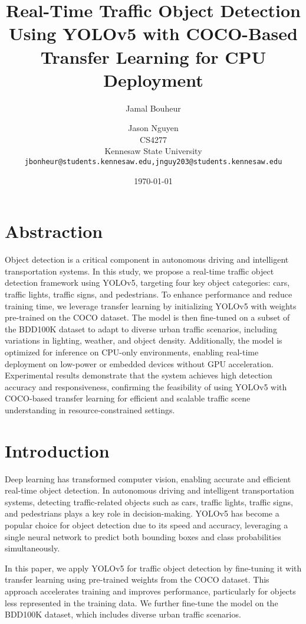 \documentclass[11pt]{article}
\title{Real-Time Traffic Object Detection Using YOLOv5 with COCO-Based Transfer Learning for CPU Deployment}
\author{Jamal Bouheur \and Jason Nguyen \\
        CS4277 \\
        Kennesaw State University \\
        \texttt{jbonheur@students.kennesaw.edu,jnguy203@students.kennesaw.edu}}
\date{\today}
\begin{document}
\maketitle

\section{Abstraction}
Object detection is a critical component in autonomous driving and intelligent transportation systems. In this study, we propose a real-time traffic object detection framework using YOLOv5, targeting four key object categories: cars, traffic lights, traffic signs, and pedestrians. To enhance performance and reduce training time, we leverage transfer learning by initializing YOLOv5 with weights pre-trained on the COCO dataset. The model is then fine-tuned on a subset of the BDD100K dataset to adapt to diverse urban traffic scenarios, including variations in lighting, weather, and object density. Additionally, the model is optimized for inference on CPU-only environments, enabling real-time deployment on low-power or embedded devices without GPU acceleration. Experimental results demonstrate that the system achieves high detection accuracy and responsiveness, confirming the feasibility of using YOLOv5 with COCO-based transfer learning for efficient and scalable traffic scene understanding in resource-constrained settings.


\section{Introduction}
Deep learning has transformed computer vision, enabling accurate and efficient real-time object detection. In autonomous driving and intelligent transportation systems, detecting traffic-related objects such as cars, traffic lights, traffic signs, and pedestrians plays a key role in decision-making. YOLOv5 has become a popular choice for object detection due to its speed and accuracy, leveraging a single neural network to predict both bounding boxes and class probabilities simultaneously.

In this paper, we apply YOLOv5 for traffic object detection by fine-tuning it with transfer learning using pre-trained weights from the COCO dataset. This approach accelerates training and improves performance, particularly for objects less represented in the training data. We further fine-tune the model on the BDD100K dataset, which includes diverse urban traffic scenarios.
\end{document}
